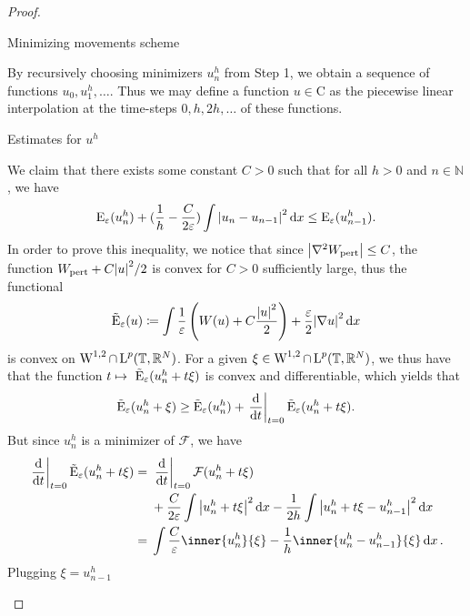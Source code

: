 \begin{proof}
\begin{description}[wide=0pt]
	\item[Step 2:] Minimizing movements scheme 
	
	By recursively choosing minimizers $ u_{ n }^{ h } $ from Step 1, we obtain a sequence of functions $ u_{ 0 }, u_{ 1 }^{ h } , \dotsc $. Thus we may define a function $ u \in \mathrm{ C } $ as the piecewise linear interpolation at the time-steps $ 0, h , 2h, \dotsc $ of these functions.
	
	\item[Step 3:] Estimates for $ u^{ h } $
	
	We claim that there exists some constant $ C > 0 $ such that for all $ h > 0 $ and $ n \in \mathbb{ N } $, we have
	\begin{equation}
		\label{discrete_optimal_energy_dissipation}
		\operatorname{E}_{ \varepsilon } ( u_{ n }^{ h } )
		+
		( \frac{ 1 }{ h } - \frac{ C }{ 2 \varepsilon } )
		\int \abs{ u_{ n } - u_{ n - 1 } }^{ 2 } \dd{ x }
		\leq
		\operatorname{E}_{ \varepsilon } ( u_{ n - 1 }^{ h } ).
	\end{equation}
	In order to prove this inequality, we notice that since $ \abs{ \nabla^{ 2 } W_{ \mathrm{pert} } } \leq C $, the function $ W_{ \mathrm{pert} } + C \abs{ u }^{ 2 }/2 $ is convex for $ C > 0 $ sufficiently large, thus the functional 
	\begin{equation*}
		\tilde{\operatorname{E}}_{ \varepsilon }  ( u )
		\coloneqq
		\int 
			\frac{ 1 }{ \varepsilon }
			\left( W ( u ) + C \frac{ \abs{ u }^{ 2 } }{ 2 } \right)
			+
			\frac{ \varepsilon}{ 2 }
			\abs{ \nabla u }^{ 2 }
		\dd{ x }
	\end{equation*}
	is convex on $ \operatorname{W}^{ 1 , 2 } \cap \operatorname{L}^{ p } ( \mathbb{ T } , \mathbb{ R }^{ N } ) $. For a given $ \xi \in \operatorname{W}^{ 1 , 2 } \cap \operatorname{L}^{ p } ( \mathbb{ T } , \mathbb{ R }^{ N } ) $, we thus have that the function
	$ t \mapsto \ \tilde{\operatorname{E}}_{ \varepsilon } ( u_{ n }^{ h } + t \xi ) $ is convex and differentiable, which yields that
	\begin{equation}
		\label{convexity_at_time_1}
		\tilde{\operatorname{E}}_{ \varepsilon } ( u_{ n }^{ h } + \xi )
		\geq
		\tilde{\operatorname{E}}_{ \varepsilon } ( u_{ n }^{ h } ) + 
		\left.\dv{ t }\right|_{ t = 0 } \tilde{\operatorname{E}}_{ \varepsilon } ( u_{ n }^{ h } + t \xi).
	\end{equation} 
	But since $ u_{ n }^{ h } $ is a minimizer of $\mathcal{ F }$, we have
	\begin{align*}
		\left. \dv{ t } \right|_{ t= 0 }
			\tilde{\energy}_{ \varepsilon} ( u_{ n }^{ h } + t \xi )
		={}&
		\left. \dv{ t } \right|_{ t = 0 } 
			\mathcal{ F } ( u_{ n }^{ h } + t \xi )
		\\
		{}&+ \frac{ C }{ 2 \varepsilon } \int \abs{ u_{ n }^{ h } + t \xi }^{ 2 } \dd{ x }
		-\frac{ 1 }{ 2h } \int \abs{ u_{n }^{ h } + t \xi - u_{ n - 1 }^{ h } }^{ 2 } \dd{ x }
		\\
		={}& 
		\int
			\frac{ C }{ \varepsilon }
			\inner{u_{ n }^{ h }}{\xi}
			-
			\frac{ 1 }{ h }
			\inner{ u_{ n }^{ h } - u_{ n - 1 } ^{ h } }{ \xi }
		\dd{x}.
	\end{align*}
	Plugging $ \xi = u_{ n - 1 }^{ h } $
	\end{description}
\end{proof}

